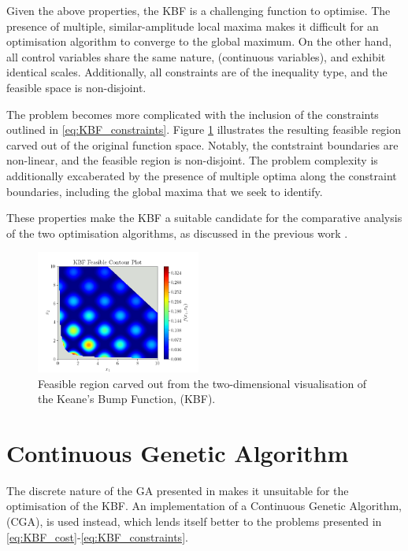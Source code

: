 \documentclass[10pt]{article}
\begin{document}
\begin{multicols}{2}
Given the above properties, the KBF is a challenging function to optimise. The presence of multiple, similar-amplitude local maxima makes it difficult for an optimisation algorithm to converge to the global maximum. On the other hand, all control variables share the same nature, (continuous variables), and exhibit identical scales. Additionally, all constraints are of the inequality type, and the feasible space is non-disjoint.

The problem becomes more complicated with the inclusion of the constraints outlined in \ref{eq:KBF_constraints}. Figure \ref{fig:KBF_Feasible} illustrates the resulting feasible region carved out of the original function space. Notably, the contstraint boundaries are non-linear, and the feasible region is non-disjoint. The problem complexity is additionally excaberated by the presence of multiple optima along the constraint boundaries, including the global maxima that we seek to identify.

These properties make the KBF a suitable candidate for the comparative analysis of the two optimisation algorithms, as discussed in the previous work \cite{ELBELTAGY1999639}.

\begin{figure}[H]
    \centering
    \includegraphics[width=0.48\textwidth]{../figures/KBF/KBF Feasible_contour.png}
    \captionsetup{justification=centering}
    \caption{Feasible region carved out from the two-dimensional visualisation of the Keane's Bump Function, (KBF).}
    \label{fig:KBF_Feasible}
\end{figure}

\section{Continuous Genetic Algorithm}

The discrete nature of the GA presented in \cite{parks2023geneticalgorithms} makes it unsuitable for the optimisation of the KBF. An implementation of a Continuous Genetic Algorithm, (CGA), is used instead, which lends itself better to the problems presented in \ref{eq:KBF_cost}-\ref{eq:KBF_constraints}.


\end{multicols}
\end{document}
